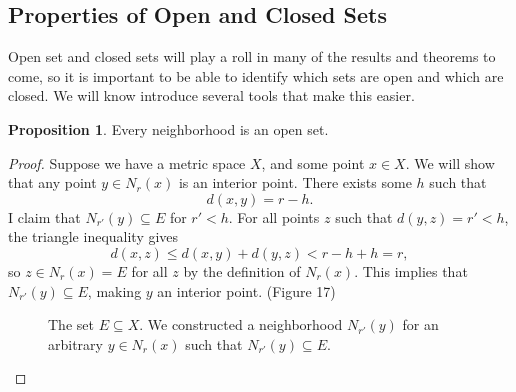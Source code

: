 \documentclass{article}
\theoremstyle{definition}
\newtheorem{proposition}{Proposition}[section]
\begin{document}
\subsection{Properties of Open and Closed Sets}
Open set and closed sets will play a roll in many of the results and theorems to come, so it is important to be able to identify which sets are open and which are closed. We will know introduce several tools that make this easier.  
\begin{proposition}
	Every neighborhood is an open set.
\end{proposition}
\begin{proof}
	Suppose we have a metric space $ X $, and some point $ x\in X $. We will show that any point $ y\in N_r(x) $ is an interior point. There exists some $ h $ such that $$d(x,y)=r-h .$$ I claim that $ N_{r'}(y)\subseteq E $ for $ r'<h $. For all points $ z $ such that $ d(y,z)=r'<h $, the triangle inequality gives $$d(x,z)\le d(x,y)+d(y,z)<r-h+h=r, $$ so $ z\in N_r(x)=E $ for all $ z $ by the definition of $ N_r(x) $. This implies that $ N_{r'}(y)\subseteq E $, making $ y $ an interior point. (Figure 17)
	\begin{figure}[h]
		\centering
		\caption{The set $ E\subseteq X $. We constructed a neighborhood $ N_{r'}(y) $ for an arbitrary $ y\in N_r(x) $ such that $ N_{r'}(y)\subseteq E $. }
	\end{figure}
\end{proof}
\end{document}
